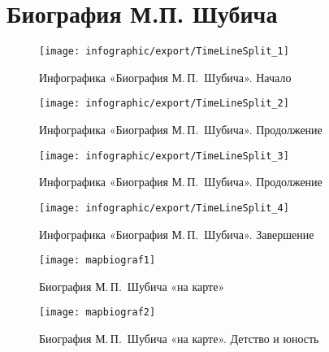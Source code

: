 ﻿\section{Биография М.П. Шубича}

\begin{figure}[H]
\texttt{[image: infographic/export/TimeLineSplit\_1]}
\caption{Инфографика «Биография М.\,П.~Шубича». Начало}
\label{fig:TimeLineSplit}
\end{figure}

\begin{figure}[t]
\ContinuedFloat %
\texttt{[image: infographic/export/TimeLineSplit\_2]}
\caption{Инфографика «Биография М.\,П.~Шубича». Продолжение}
\end{figure}

\begin{figure}[t]
\ContinuedFloat %
\texttt{[image: infographic/export/TimeLineSplit\_3]}
\caption{Инфографика «Биография М.\,П.~Шубича». Продолжение}
\end{figure}

\begin{figure}[t]
\ContinuedFloat %
\texttt{[image: infographic/export/TimeLineSplit\_4]}
\caption{Инфографика «Биография М.\,П.~Шубича». Завершение}
\end{figure}

\FloatBarrier

\begin{figure}[h]
\texttt{[image: mapbiograf1]}
\caption{Биография М.\,П.~Шубича «на карте»}
\label{fig:mapbiograf1}
\end{figure}

\begin{figure}[h]
\texttt{[image: mapbiograf2]}
\caption{Биография М.\,П.~Шубича «на карте». Детство и юность}
\label{fig:mapbiograf2}
\end{figure}


